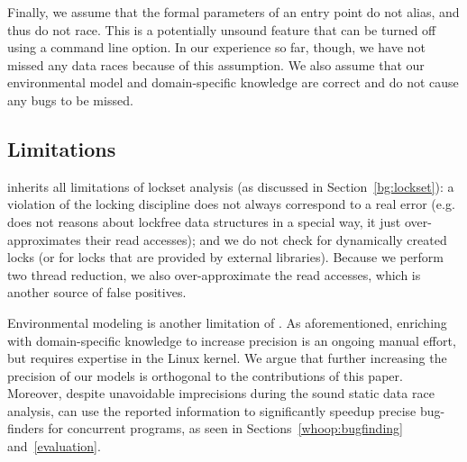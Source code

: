 Finally, we assume that the formal parameters of an entry point do not alias, and thus do not race. This is a potentially unsound feature that can be turned off using a command line option. In our experience so far, though, we have not missed any data races because of this assumption. We also assume that our environmental model and domain-specific knowledge are correct and do not cause any bugs to be missed.

\subsection{Limitations}
\label{whoop:limitations}

\whoop inherits all limitations of lockset analysis (as discussed in Section~\ref{bg:lockset}): a violation of the locking discipline does not always correspond to a real error (e.g. \whoop does not reasons about lockfree data structures in a special way, it just over-approximates their read accesses); and we do not check for dynamically created locks (or for locks that are provided by external libraries). Because we perform two thread reduction, we also over-approximate the read accesses, which is another source of false positives.

Environmental modeling is another limitation of \whoop. As aforementioned, enriching \whoop with domain-specific knowledge to increase precision is an ongoing manual effort, but requires expertise in the Linux kernel. We argue that further increasing the precision of our models is orthogonal to the contributions of this paper. Moreover, despite unavoidable imprecisions during the sound static data race analysis, \whoop can use the reported information to significantly speedup precise bug-finders for concurrent programs, as seen in Sections~\ref{whoop:bugfinding} and~\ref{evaluation}.

